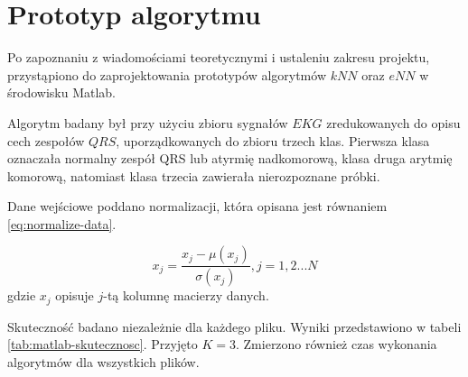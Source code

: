 \section{Prototyp algorytmu}
Po zapoznaniu z wiadomościami teoretycznymi i ustaleniu zakresu projektu, przystąpiono do zaprojektowania prototypów algorytmów $kNN$ oraz $eNN$ w środowisku Matlab.

Algorytm badany był przy użyciu zbioru sygnałów $EKG$ zredukowanych do opisu cech zespołów $QRS$, uporządkowanych do zbioru trzech klas. Pierwsza klasa oznaczała normalny zespół QRS lub atyrmię nadkomorową, klasa druga arytmię komorową, natomiast klasa trzecia zawierała nierozpoznane próbki. 

Dane wejściowe poddano normalizacji, która opisana jest równaniem \ref{eq:normalize-data}.

\begin{equation}
\label{eq:normalize-data}
x_j = \frac{x_j - \mu(x_j)}{\sigma(x_j)}, j=1,2...N
\end{equation}
gdzie $x_j$ opisuje $j$-tą kolumnę macierzy danych.

Skuteczność badano niezależnie dla każdego pliku. Wyniki przedstawiono w tabeli \ref{tab:matlab-skutecznosc}. Przyjęto $K=3$. Zmierzono również czas wykonania algorytmów dla wszystkich plików.

